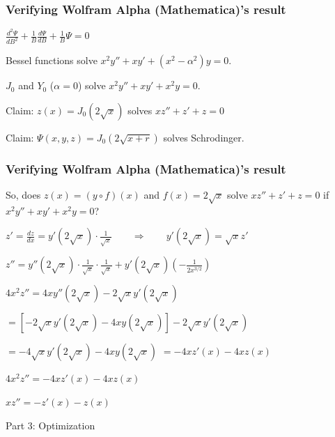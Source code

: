 \documentclass{beamer}
\begin{document}
\begin{frame}
\frametitle{Verifying Wolfram Alpha (Mathematica)'s result}
\begin{center}
\centerline{$\frac{d^2\Psi}{dB^2} + \frac{1}{B}\frac{d\Psi}{dB} + \frac{1}{B}\Psi = 0$}
\vskip 40pt

Bessel functions solve $x^2 y'' + x y' + (x^2 - \alpha^2)y = 0$.
\vskip 20pt

$J_0$ and $Y_0$ ($\alpha = 0$) solve $x^2 y'' + x y' + x^2 y = 0$.

\vskip 20pt
Claim: $z(x) = J_0(2\sqrt{x})$ solves $x z'' + z' + z = 0$

\vskip 20pt
Claim: $\Psi(x,y,z) = J_0(2\sqrt{x+r})$ solves Schrodinger.
\end{center}
\end{frame}

\begin{frame}
\frametitle{Verifying Wolfram Alpha (Mathematica)'s result}
\begin{center}
So, does $z(x) = (y\circ f)(x)$ and $f(x) = 2\sqrt{x}$ solve $x z'' + z' + z = 0$
if $x^2 y'' + x y' + x^2 y = 0$?

\vskip 20pt 

$z' = \frac{dz}{dx} = y'(2\sqrt{x}) \cdot \frac{1}{\sqrt{x}} \qquad \Rightarrow \qquad y'(2\sqrt{x}) = \sqrt{x} z'$

$z'' = y''(2\sqrt{x}) \cdot \frac{1}{\sqrt{x}} \cdot \frac{1}{\sqrt{x}} + y'(2\sqrt{x}) \left(-\frac{1}{2x^{3/2}}\right)$

\vskip 20pt 

$4 x^2 z'' = 4 x y''(2\sqrt{x}) - 2 \sqrt{x} y'(2\sqrt{x})$

$ = \left[ -2 \sqrt{x} y'(2\sqrt{x}) - 4x y(2\sqrt{x})\right] - 2 \sqrt{x} y'(2\sqrt{x})$

$ = -4 \sqrt{x} y'(2\sqrt{x}) - 4x y(2\sqrt{x})$
$ = -4 x z'(x) - 4x z(x)$

\vskip 20pt
$4 x^2 z'' = -4 x z'(x) - 4x z(x)$

$x z'' = - z'(x) - z(x)$
\end{center}
\end{frame}

\begin{frame}
\begin{exampleblock}{}
\begin{center}
\vskip 20pt
\Huge
Part 3: Optimization
\vskip 6pt
\ 
\end{center}
\end{exampleblock}
\end{frame}
\end{document}
